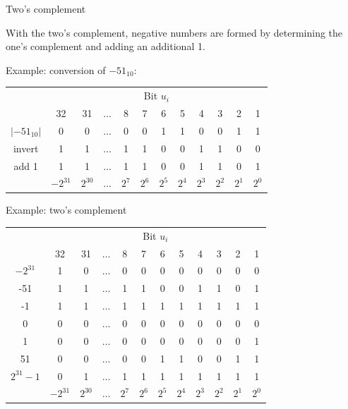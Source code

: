 \documentclass[11pt,compress,t,notes=noshow, xcolor=table]{beamer}
\begin{document}
\begin{vbframe}{Two's complement}

With the two's complement, negative numbers are formed by determining the one's complement and adding an additional 1.

\lz 

Example: conversion of $-51_{10}$:
\begin{footnotesize}
\begin{center}
  \begin{tabular}{ c | ccccccccccc}
      & \multicolumn{11}{c}{Bit $u_i$} \\
      & 32 & 31  & $\hdots$ & 8 & 7 & 6 & 5 & 4 & 3 & 2 & 1 \\
    \hline
    $|-51_{10}|$  & 0 & 0 & $\hdots$ & 0 & 0 & 1 & 1 & 0 & 0 & 1 & 1 \\
    invert & 1 & 1 & $\hdots$ & 1 & 1 & 0 & 0 & 1 & 1 & 0 & 0 \\
    add 1 & 1 & 1 & $\hdots$ & 1 & 1 & 0 & 0 & 1 & 1 & 0 & 1 \\
    \hline
      & $-2^{31}$ & $2^{30}$ & $\hdots$ & $2^7$ & $2^6$ & $2^5$ & $2^4$ & $2^3$ & $2^2$ & $2^1$ & $2^0$
  \end{tabular}
\end{center}
\end{footnotesize}

\framebreak


Example: two's complement
\begin{footnotesize}
\begin{center}
  \begin{tabular}{ c | ccccccccccc}
      & \multicolumn{11}{c}{Bit $u_i$} \\
      & 32 & 31  & $\hdots$ & 8 & 7 & 6 & 5 & 4 & 3 & 2 & 1 \\
    \hline
    $-2^{31}$    & 1 & 0 & $\hdots$ & 0 & 0 & 0 & 0 & 0 & 0 & 0 & 0 \\
    -51          & 1 & 1 & $\hdots$ & 1 & 1 & 0 & 0 & 1 & 1 & 0 & 1 \\
    -1           & 1 & 1 & $\hdots$ & 1 & 1 & 1 & 1 & 1 & 1 & 1 & 1 \\
    0            & 0 & 0 & $\hdots$ & 0 & 0 & 0 & 0 & 0 & 0 & 0 & 0 \\
    1            & 0 & 0 & $\hdots$ & 0 & 0 & 0 & 0 & 0 & 0 & 0 & 1 \\
    51           & 0 & 0 & $\hdots$ & 0 & 0 & 1 & 1 & 0 & 0 & 1 & 1 \\
    $2^{31}-1$   & 0 & 1 & $\hdots$ & 1 & 1 & 1 & 1 & 1 & 1 & 1 & 1 \\
    \hline
      & $-2^{31}$ & $2^{30}$ & $\hdots$ & $2^7$ & $2^6$ & $2^5$ & $2^4$ & $2^3$ & $2^2$ & $2^1$ & $2^0$
  \end{tabular}
\end{center}
\end{footnotesize}


\end{vbframe}
\end{document}
